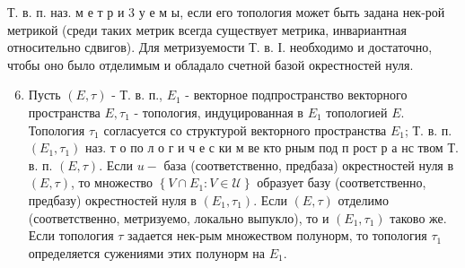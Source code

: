 \documentclass[10pt]{article}
\begin{document}
Т. в. п. наз. м е т р и 3 у е м ы, если его топология может быть задана нек-рой метрикой (среди таких метрик всегда существует метрика, инвариантная относительно сдвигов). Для метризуемости Т. в. І. необходимо и достаточно, чтобы оно было отделимым и обладало счетной базой окрестностей нуля.



\begin{enumerate}

  \setcounter{enumi}{5}

  \item Пусть $(E, \tau)$ - Т. в. п., $E_{1}$ - векторное подпространство векторного пространства $E, \tau_{1}$ - топология, индуцированная в $E_{1}$ топологией $E$. Топология $\tau_{1}$ согласуется со структурой векторного пространства $E_{1}$; Т. в. п. $\left(E_{1}, \tau_{1}\right)$ наз. т о по л о г и ч е с ки м ве кто рным под п рост р а нс твом Т. в. п. $(E, \tau)$. Если $u-$ база (соответственно, предбаза) окрестностей нуля в $(E, \tau)$, то множество $\left\{V \cap E_{1}: V \in \mathcal{U}\right\}$ образует базу (соответственно, предбазу) окрестностей нуля в $\left(E_{1}, \tau_{1}\right)$. Если $(E, \tau)$ отделимо (соответственно, метризуемо, локально выпукло), то и $\left(E_{1}, \tau_{1}\right)$ таково же. Если топология $\tau$ задается нек-рым множеством полунорм, то топология $\tau_{1}$ определяется сужениями этих полунорм на $E_{1}$.




\end{enumerate}
\end{document}
